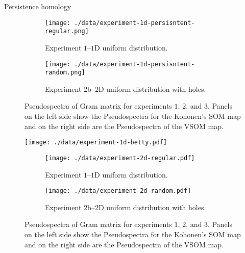 \documentclass[10pt]{article}
\theoremstyle{definition}
\begin{document}
Persistence homology 


\begin{figure}[!htpb]
     \begin{subfigure}{\textwidth}
         \centering
         \texttt{[image: ./data/experiment-1d-persisntent-regular.png]}
         \caption{Experiment $1$--$1$D uniform distribution.}%
         \label{Fig:psa_exp1}
     \end{subfigure}
     \newline 
     \begin{subfigure}{\textwidth}
         \centering
         \texttt{[image: ./data/experiment-1d-persisntent-random.png]}
         \caption{Experiment $2$b--$2$D uniform distribution with holes.}%
         \label{Fig:psa_exp2b}
     \end{subfigure}
    \caption{Pseudospectra of Gram matrix for experiments $1$, $2$, and $3$.
    Panels on the left side show the Pseudospectra for the Kohonen's SOM map
    and on the right side are the Pseudospectra of the VSOM map.}%
    \label{Fig:psas}
\end{figure}

\begin{figure}[!htpb]
    \centering
    \texttt{[image: ./data/experiment-1d-betty.pdf]}
    \caption{}%
    \label{Fig:betti-1}
\end{figure}

\begin{figure}[!htpb]
     \begin{subfigure}{\textwidth}
         \centering
         \texttt{[image: ./data/experiment-2d-regular.pdf]}
         \caption{Experiment $1$--$1$D uniform distribution.}%
         \label{Fig:psa_exp1}
     \end{subfigure}
     \newline 
     \begin{subfigure}{\textwidth}
         \centering
         \texttt{[image: ./data/experiment-2d-random.pdf]}
         \caption{Experiment $2$b--$2$D uniform distribution with holes.}%
         \label{Fig:psa_exp2b}
     \end{subfigure}
    \caption{Pseudospectra of Gram matrix for experiments $1$, $2$, and $3$.
    Panels on the left side show the Pseudospectra for the Kohonen's SOM map
    and on the right side are the Pseudospectra of the VSOM map.}%
    \label{Fig:psas}
\end{figure}
\end{document}
